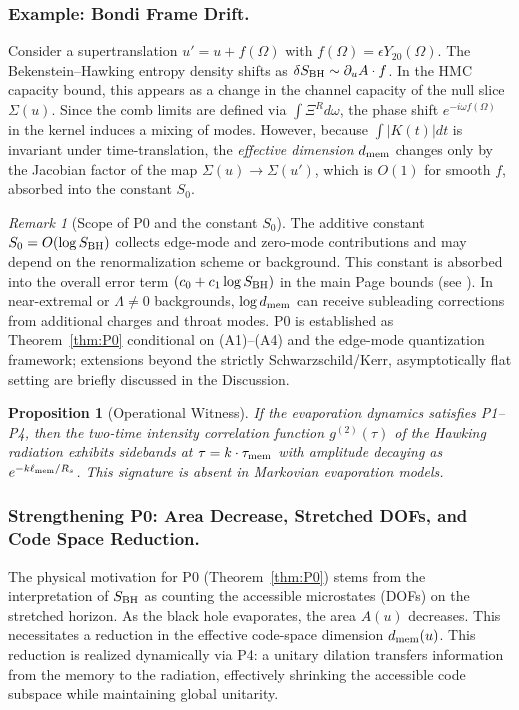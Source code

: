 \documentclass[aps,prd,preprint,onecolumn,superscriptaddress,nofootinbib,longbibliography,floatfix,11pt,showpacs,showkeys]{revtex4-2}
\theoremstyle{plain}
\newtheorem{proposition}[theorem]{Proposition}
\theoremstyle{definition}
\theoremstyle{remark}
\newtheorem{remark}[theorem]{Remark}
\begin{document}
\subsubsection{Example: Bondi Frame Drift.}
Consider a supertranslation $u' = u + f(\Omega)$ with $f(\Omega) = \epsilon Y_{20}(\Omega)$.
The Bekenstein--Hawking entropy density shifts as $\delta S_{\rm BH} \sim \partial_u A \cdot f$.
In the HMC capacity bound, this appears as a change in the channel capacity of the null slice $\Sigma(u)$.
Since the comb limits are defined via $\int \Xi^R d\omega$, the phase shift $e^{-i\omega f(\Omega)}$ in the kernel induces a mixing of modes.
However, because $\int |K(t)| dt$ is invariant under time-translation, the \emph{effective dimension} $d_{\rm mem}$ changes only by the Jacobian factor of the map $\Sigma(u) \to \Sigma(u')$, which is $O(1)$ for smooth $f$, absorbed into the constant $S_0$.

\begin{remark}[Scope of P0 and the constant $S_0$]\label{rem:scope_P0}
The additive constant $S_0=O(\log S_{\rm BH})$ collects edge-mode and zero-mode contributions and may depend on the renormalization scheme or background. This constant is absorbed into the overall error term $(c_0 + c_1\log S_{\rm BH})$ in the main Page bounds (see ).
In near-extremal or $\Lambda\!\neq\!0$ backgrounds, $\log d_{\rm mem}$ can receive subleading corrections from additional charges and throat modes.
P0 is established as Theorem~\ref{thm:P0} conditional on (A1)--(A4) and the edge-mode quantization framework; extensions beyond the strictly Schwarzschild/Kerr, asymptotically flat setting are briefly discussed in the Discussion.
\end{remark}

\begin{proposition}[Operational Witness]\label{prop:operational-witness}
If the evaporation dynamics satisfies P1--P4, then the two-time intensity correlation function $g^{(2)}(\tau)$ of the Hawking radiation exhibits sidebands at $\tau = k \cdot \tau_{\rm mem}$ with amplitude decaying as $e^{-k \ell_{\rm mem}/R_s}$. This signature is absent in Markovian evaporation models.
\end{proposition}
\subsubsection{Strengthening P0: Area Decrease, Stretched DOFs, and Code Space Reduction.}
The physical motivation for P0 (Theorem~\ref{thm:P0}) stems from the interpretation of $S_{\rm BH}$ as counting the accessible microstates (DOFs) on the stretched horizon. As the black hole evaporates, the area $A(u)$ decreases. This necessitates a reduction in the effective code-space dimension $d_{\rm mem}(u)$. This reduction is realized dynamically via P4: a unitary dilation transfers information from the memory to the radiation, effectively shrinking the accessible code subspace while maintaining global unitarity.
\end{document}
